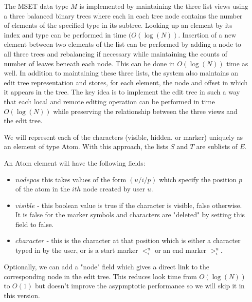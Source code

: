 \documentclass{amsart}
\begin{document}
The MSET data type $M$ is implemented by maintaining the three list views using a three balanced binary trees where each in each tree node contains the number of elements of the specified type in its subtree. Looking up an element by its index and type can be performed in time $(O(\log(N))$.
Insertion of a new element between two elements of the list can be performed by adding a node to all three trees and rebalancing if necessary while maintaining the counts of number of leaves beneath each node. This can be done in $O(\log(N))$ time as well. In addition to maintaining these three lists, the system also maintains an edit tree representation and stores, for each element, the node and offset in which it appears in the tree. The key idea is to implement the edit tree in such a way that each local and remote editing operation can be performed in time $O(\log(N))$ while preserving the relationship between the three views and the edit tree. 

We will represent each of the characters (visible, hidden, or marker) uniquely as an
element of type Atom.  With this approach, the lists $S$ and $T$ are sublists of $E$.

An Atom element will have the following fields:
\begin{itemize}
\item $nodepos$ this takes values of the form $(u/i/p)$ which specify the position $p$ of the atom in the $ith$ node created by user $u$.
\item $visible$ - this boolean value is true if the character is visible, false otherwise. It is false for the marker symbols and characters are "deleted" by setting this field to false.
\item $character$ - this is the character at that position which is either a character typed in by the user, or is a start marker $<^u_i$ or an end marker $>^u_i$.
\end{itemize}
Optionally, we can add a "node" field which gives a direct link to the corresponding node in the edit tree. This reduces look time from $O(\log(N))$ to $O(1)$ but
doesn't improve the asypmptotic performance so we will skip it in this version.
\end{document}
